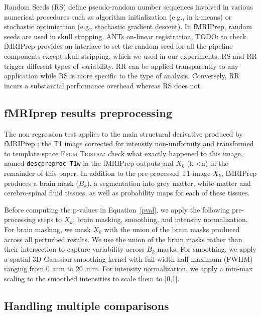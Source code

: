 \documentclass{article}
\newcommand{\TODO}[1]{\color{red}\textsc{TODO:} #1\color{black}\xspace}
\newcommand{\TG}[1]{\color{blue}\textsc{From Tristan:} #1\color{black}\xspace}
\newcommand{\fmriprep}{fMRIPrep \xspace}
\begin{document}
Random Seeds (RS) define pseudo-random number sequences involved in various 
numerical procedures such as algorithm initialization (e.g., in k-means) or stochastic
optimization (e.g., stochastic gradient descent). In fMRIPrep, random seeds are used in skull stripping, ANTs on-linear registration, \TODO{to check}. fMRIPrep provides an interface to set the random seed for all the pipeline components except skull stripping, which we used in our experiments. RS and RR trigger different types of variability. RR can be applied transparently to any application while RS is more specific to the type of analysis. Conversely, RR incurs a substantial performance overhead whereas RS does not.

\subsection{fMRIprep results preprocessing}

The non-regression test applies to the main structural derivative produced by \fmriprep: the T1 image corrected for intensity non-uniformity and transformed to template space \TG{check what exactly happened to this image}, named \texttt{desc\-preproc\_T1w} in the \fmriprep outputs and $X_k$ (k \textless n) in the remainder of this paper. In addition to the pre-processed T1 image $X_k$, \fmriprep produces a brain mask ($B_k$), a segmentation into grey matter, white matter and cerebro-spinal fluid tissues, as well as probability maps for each of these tissues.

Before computing the p-values in Equation~\ref{pval}, we apply the following pre-processing steps to $X_k$: brain masking, smoothing, and intensity normalization. For brain masking, we mask $X_k$ with the union of the brain masks produced across all perturbed results. We use the union of the brain masks rather than their intersection to capture variability across $B_k$ masks. For smoothing, we apply a spatial 3D Gaussian smoothing kernel with full-width half maximum (FWHM) ranging from 0~mm to 20~mm. For intensity normalization, we apply a min-max scaling to the smoothed intensities to scale them to [0,1]. 

\subsection{Handling multiple comparisons}
\end{document}
